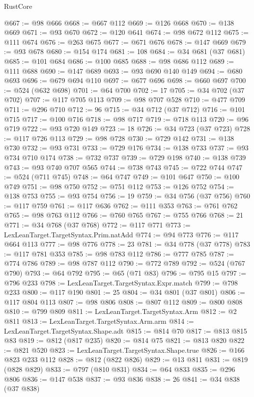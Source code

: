\begin{lexlean}{RustCore}
\begin{coremodule}
@667 := @98 @666
@668 := @667 @112
@669 := @126 @668
@670 := @138 @669
@671 := @93 @670
@672 := @120 @641
@674 := @98 @672 @112
@675 := @111 @674
@676 := @263 @675
@677 := @671 @676
@678 := @147 @669
@679 := @93 @678
@680 := @154 @174
@681 := 108
@684 := @34 @681 (@37 @681)
@685 := @101 @684
@686 := @100 @685
@688 := @98 @686 @112
@689 := @111 @688
@690 := @147 @689
@693 := @93 @690 @140 @149
@694 := @680 @693
@696 := @679 @694 @110
@697 := @677 @696
@698 := @660 @697
@700 := @524 (@632 @698)
@701 := @64 @700
@702 := 17
@705 := @34 @702 (@37 @702)
@707 := @117 @705 @113
@709 := @98 @707 @528
@710 := @477 @709
@711 := @296 @710
@712 := 96
@715 := @34 @712 (@37 @712)
@716 := @101 @715
@717 := @100 @716
@718 := @98 @717
@719 := @718 @113
@720 := @96 @719
@722 := @93 @720 @149
@723 := 18
@726 := @34 @723 (@37 @723)
@728 := @117 @726 @113
@729 := @98 @728
@730 := @729 @142
@731 := @138 @730
@732 := @93 @731
@733 := @729 @176
@734 := @138 @733
@737 := @93 @734 @710 @174
@738 := @732 @737
@739 := @729 @198
@740 := @138 @739
@743 := @93 @740 @707 @565
@744 := @738 @743
@745 := @722 @744
@747 := @524 (@711 @745)
@748 := @64 @747
@749 := @101 @647
@750 := @100 @749
@751 := @98 @750
@752 := @751 @112
@753 := @126 @752
@754 := @138 @753
@755 := @93 @754
@756 := 19
@759 := @34 @756 (@37 @756)
@760 := @117 @759
@761 := @117 @636
@762 := @111 @353
@763 := @761 @762
@765 := @98 @763 @112
@766 := @760 @765
@767 := @755 @766
@768 := 21
@771 := @34 @768 (@37 @768)
@772 := @117 @771
@773 := LexLeanTarget.TargetSyntax.Prim.natAdd
@774 := @94 @773
@776 := @117 @664 @113
@777 := @98 @776
@778 := 23
@781 := @34 @778 (@37 @778)
@783 := @117 @781 @353
@785 := @98 @783 @112
@786 := @777 @785
@787 := @774 @786
@789 := @98 @787 @112
@790 := @772 @789
@792 := @524 (@767 @790)
@793 := @64 @792
@795 := @65 (@71 @83)
@796 := @795 @15
@797 := @796 @233
@798 := LexLeanTarget.TargetSyntax.Expr.match
@799 := @798 @233
@800 := @117 @190
@801 := 25
@804 := @34 @801 (@37 @801)
@806 := @117 @804 @113
@807 := @98 @806
@808 := @807 @112
@809 := @800 @808
@810 := @799 @809
@811 := LexLeanTarget.TargetSyntax.Arm
@812 := @2 @811
@813 := LexLeanTarget.TargetSyntax.Arm.arm
@814 := LexLeanTarget.TargetSyntax.Shape.adt
@815 := @814 @70
@817 := @813 @815 @83
@819 := @812 (@817 @235)
@820 := @814 @75
@821 := @813 @820
@822 := @821 @520
@823 := LexLeanTarget.TargetSyntax.Shape.true
@826 := @166 @823 @233 @112
@828 := @812 (@822 @826)
@829 := @13 @811
@831 := @819 (@828 @829)
@833 := @797 (@810 @831)
@834 := @64 @833
@835 := @296 @806
@836 := @147 @538
@837 := @93 @836
@838 := 26
@841 := @34 @838 (@37 @838)

\end{coremodule}
\end{lexlean}
